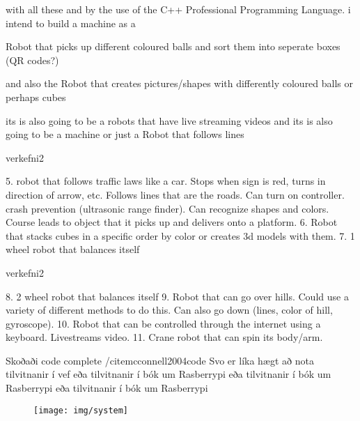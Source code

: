 	with all these and by the use of the C++ Professional Programming Language. i intend to build a machine as a

	Robot that picks up different coloured balls and sort them into seperate boxes (QR codes?)

	and also the Robot that creates pictures/shapes with differently coloured balls or perhaps cubes

	its is also going to be a robots that have live streaming videos and its is also going to be a machine or just a 
	Robot that follows lines 

verkefni2

5.  robot that follows traffic laws like a car. Stops when sign is red, turns in direction of arrow, etc. Follows lines that are the roads. Can turn on controller.
    crash prevention (ultrasonic range finder). Can recognize shapes and colors. Course leads to object that it picks up and delivers onto a platform.
6.  Robot that stacks cubes in a specific order by color or creates 3d models with them.
7.  1 wheel robot that balances itself

verkefni2

8.  2 wheel robot that balances itself
9.  Robot that can go over hills. Could use a variety of different methods to do this. Can also go down (lines, color of hill, gyroscope).
10. Robot that can be controlled through the internet using a keyboard. Livestreams video.
11. Crane robot that can spin its body/arm.





Skoðaði code complete /cite{mcconnell2004code}
Svo er líka hægt að nota tilvitnanir í vef \cite{WinNT}
eða tilvitnanir í bók um Rasberrypi \cite{brock2013changing}
eða tilvitnanir í bók um Rasberrypi \cite{test}
eða tilvitnanir í bók um Rasberrypi \cite{test2}
\begin{figure}[h]
\texttt{[image: img/system]}
\end{figure}




